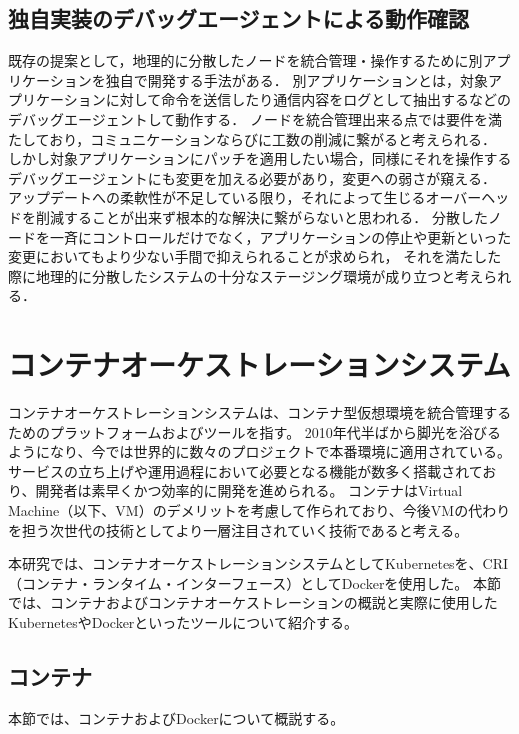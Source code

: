 \subsection{独自実装のデバッグエージェントによる動作確認}
既存の提案として，地理的に分散したノードを統合管理・操作するために別アプリケーションを独自で開発する手法がある．
別アプリケーションとは，対象アプリケーションに対して命令を送信したり通信内容をログとして抽出するなどのデバッグエージェントして動作する．
ノードを統合管理出来る点では要件を満たしており，コミュニケーションならびに工数の削減に繋がると考えられる．
しかし対象アプリケーションにパッチを適用したい場合，同様にそれを操作するデバッグエージェントにも変更を加える必要があり，変更への弱さが窺える．
アップデートへの柔軟性が不足している限り，それによって生じるオーバーヘッドを削減することが出来ず根本的な解決に繋がらないと思われる．
分散したノードを一斉にコントロールだけでなく，アプリケーションの停止や更新といった変更においてもより少ない手間で抑えられることが求められ，
それを満たした際に地理的に分散したシステムの十分なステージング環境が成り立つと考えられる．

\section{コンテナオーケストレーションシステム}
\label{background:container-orchestration-system}

コンテナオーケストレーションシステムは、コンテナ型仮想環境を統合管理するためのプラットフォームおよびツールを指す。
2010年代半ばから脚光を浴びるようになり、今では世界的に数々のプロジェクトで本番環境に適用されている。
サービスの立ち上げや運用過程において必要となる機能が数多く搭載されており、開発者は素早くかつ効率的に開発を進められる。
コンテナはVirtual Machine（以下、VM）のデメリットを考慮して作られており、今後VMの代わりを担う次世代の技術としてより一層注目されていく技術であると考える。

本研究では、コンテナオーケストレーションシステムとしてKubernetesを、CRI（コンテナ・ランタイム・インターフェース）としてDockerを使用した。
本節では、コンテナおよびコンテナオーケストレーションの概説と実際に使用したKubernetesやDockerといったツールについて紹介する。

\subsection{コンテナ}
\label{background:container-orchestration-system:container}

本節では、コンテナおよびDockerについて概説する。

